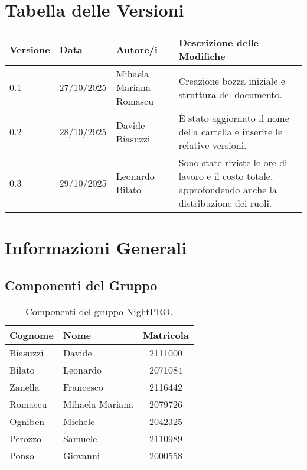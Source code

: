 \documentclass[a4paper, 11pt, oneside]{scrartcl} %
\begin{document}
\section*{Tabella delle Versioni}
\vspace{0.2cm} 
\begin{center}
\renewcommand{\arraystretch}{1.2}
\begin{tabular}{@{}llp{}p{}@{}} 
\toprule
\textbf{Versione} & \textbf{Data} & \textbf{Autore/i} & \textbf{Descrizione delle Modifiche} \\
\midrule
0.1 & 27/10/2025 & Mihaela Mariana Romascu & Creazione bozza iniziale e struttura del documento. \\
0.2 & 28/10/2025 & Davide Biasuzzi & È stato aggiornato il nome della cartella e inserite le relative versioni. \\
0.3 & 29/10/2025 & Leonardo Bilato & Sono state riviste le ore di lavoro e il costo totale, approfondendo anche la distribuzione dei ruoli.\\
\bottomrule
\end{tabular}
\end{center}



\newpage
\tableofcontents %
\pagestyle{fancy} %


\newpage
\section{Informazioni Generali}

\subsection{Componenti del Gruppo}

\begin{table}[h!]
\centering
\renewcommand{\arraystretch}{1.2} %
\begin{tabular}{@{}llc@{}}
\toprule
\textbf{Cognome} & \textbf{Nome} & \textbf{Matricola} \\
\midrule
Biasuzzi & Davide & 2111000 \\
Bilato & Leonardo & 2071084 \\
Zanella & Francesco & 2116442 \\
Romascu & Mihaela-Mariana & 2079726 \\
Ogniben & Michele & 2042325 \\
Perozzo & Samuele & 2110989 \\
Ponso & Giovanni & 2000558 \\
\bottomrule
\end{tabular}
\caption{Componenti del gruppo NightPRO.}
\end{table}
\end{document}

